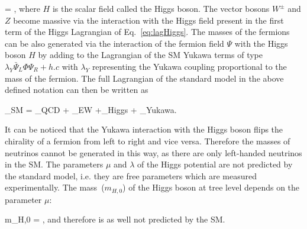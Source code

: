 {
    \Phi = ,
}
where $H$ is the scalar field called the Higgs boson. The vector bosons $W^{\pm}$ and $Z$ become massive via the interaction with the Higgs field present in the first term of the Higgs Lagrangian of Eq.~\ref{eq:lagHiggs}. The masses of the fermions can be also generated via the interaction of the fermion field  $\Psi$ with the Higgs boson $H$ by adding  to the Lagrangian of the SM Yukawa terms of type $\lambda_{Y} \bar{\Psi}_{L} \Phi \Psi_{R} + h.c$ with $\lambda_{Y}$ representing the Yukawa coupling proportional to the mass of the fermion. The full Lagrangian of the standard model in the above defined notation can then be written as

{
 _{SM} = _{QCD} + _{EW} +_{Higgs} + _{Yukawa}.
} 

It can be noticed  that the Yukawa interaction with the Higgs boson flips the chirality of a fermion from left to right and vice versa. Therefore the masses of neutrinos cannot be generated in this way, as there are only left-handed neutrinos in the SM. The parameters $\mu$ and $\lambda$ of the Higgs potential are not predicted by the standard model, i.e. they are free parameters which are measured experimentally. The mass~($m_{H,0}$) of the Higgs boson at tree level depends on the parameter $\mu$: 

{
m_{H,0} = \mu,
}
and therefore is as well not predicted by the SM. 


